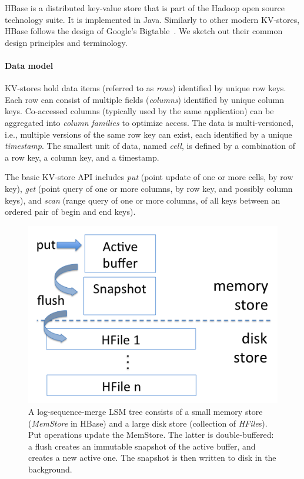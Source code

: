 
HBase is a distributed key-value store that is part of the Hadoop open source  technology suite. 
It is implemented in Java. Similarly to other modern KV-stores, HBase follows the design of 
Google's Bigtable~\cite{Chang2008}. We sketch out their common design principles 
and terminology. 

\paragraph{Data model}
KV-stores hold data items (referred to as \emph{rows}) identified by unique 
row keys. Each row can consist of multiple fields (\emph{columns}) identified by unique 
column keys. Co-accessed columns (typically used by the same application) can be 
aggregated into  \emph{column families} to optimize access. The data is multi-versioned, 
i.e., multiple versions of the same row key can exist, each identified by a unique {\em timestamp}. 
The smallest unit of data, named {\em cell}, is defined by a combination of a row key, a
column key, and a timestamp.

The basic KV-store API includes \emph{put} (point update of one or more cells, by row key), 
\emph{get} (point query of one or more columns, by row key, and possibly column keys), 
and \emph{scan} (range query of one or more columns, of all keys between 
an ordered pair of begin and end keys). 

\begin{figure}[tb]
\center
\includegraphics[width=0.9\columnwidth]{LSM} 
\caption{A log-sequence-merge LSM tree consists of a small memory store ({\em MemStore} in HBase) 
and a large disk store (collection of {\em HFile}s). Put operations update the MemStore. The latter is 
double-buffered: a flush creates an immutable snapshot of the active buffer, and creates a new active 
one. The snapshot is then written to disk in the background.}
\label{fig:LSM}
\end{figure}

